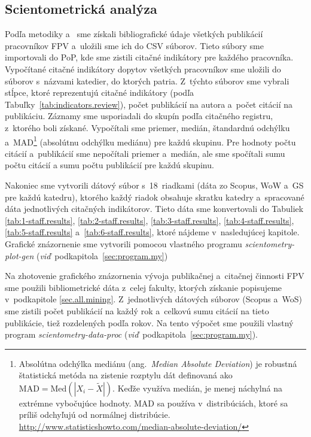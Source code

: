 \subsection{Scientometrická analýza}

Podľa metodiky \citet{Kazakis2014a} a~\citet{Kazakis2014b,Kazakis2015} sme
získali bibliografické údaje všetkých publikácií pracovníkov FPV a~uložili sme
ich do CSV súborov.  Tieto súbory sme importovali do PoP, kde sme zistili
citačné indikátory pre každého pracovníka.  Vypočítané citačné indikátory
dopytov všetkých pracovníkov sme uložili do súborov s~názvami katedier, do
ktorých patria.  Z~týchto súborov sme vybrali stĺpce, ktoré reprezentujú citačné
indikátory (podľa Tabuľky~\ref{tab:indicators.review}), počet publikácií na
autora a~počet citácií na publikáciu.  Záznamy sme usporiadali do skupín podľa
citačného registru, z~ktorého boli získané.  Vypočítali sme priemer, medián,
štandardnú odchýlku a~MAD\footnote{Absolútna odchýlka mediánu
  (ang.~\emph{Median Absolute Deviation}) je robustná štatistická metóda na
  zistenie rozptylu dát definovaná ako $\mathrm{MAD} = \mathrm{Med}(|X_i - \tilde{X}|)$.
  Keďže využíva medián, je menej náchylná na extrémne vybočujúce hodnoty.
  MAD sa používa v~distribúciách, ktoré sa príliš odchyľujú od normálnej
  distribúcie.\\\url{http://www.statisticshowto.com/median-absolute-deviation/}}
(absolútnu odchýlku mediánu) pre každú skupinu.  Pre hodnoty počtu citácií
a~publikácií sme nepočítali priemer a~medián, ale sme spočítali sumu počtu citácií
a sumu počtu publikácií pre každú skupinu.

Nakoniec sme vytvorili dátový súbor s~18~riadkami (dáta zo Scopus, WoW a~GS pre
každú katedru), ktorého každý riadok obsahuje skratku katedry a~spracované dáta
jednotlivých citačných indikátorov.  Tieto dáta sme konvertovali do Tabuliek
\ref{tab:1-staff.results}, \ref{tab:2-staff.results}, \ref{tab:3-staff.results},
\ref{tab:4-staff.results}, \ref{tab:5-staff.results}
a~\ref{tab:6-staff.results}, ktoré nájdeme v~nasledujúcej kapitole.  Grafické
znázornenie sme vytvorili pomocou vlastného programu
\emph{scientometry-plot-gen} (\emph{viď}~podkapitola~\ref{sec:program.my})

Na zhotovenie grafického znázornenia vývoja publikačnej a~citačnej činnosti FPV
sme použili bibliometrické dáta z~celej fakulty, ktorých získanie popisujeme
v~podkapitole \ref{sec.all.mining}.  Z~jednotlivých dátových súborov (Scopus
a~WoS) sme zistili počet publikácií na každý rok a~celkovú sumu citácií na tieto
publikácie, tiež rozdelených podľa rokov.  Na tento výpočet sme použili vlastný
program \emph{scientometry-data-proc}
(\emph{viď}~podkapitola~\ref{sec:program.my}).


